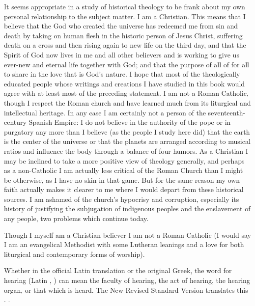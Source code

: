 It seems appropriate in a study of historical theology to be frank about my own
personal relationship to the subject matter.
I am a Christian.
This means that I believe that the God who created the universe has redeemed me
from sin and death by taking on human flesh in the historic person of Jesus
Christ, suffering death on a cross and then rising again to new life on the
third day, and that the Spirit of God now lives in me and all other believers
and is working to give us ever-new and eternal life together with God; and that
the purpose of all of for all to share in the love that is God's nature.
I hope that most of the theologically educated people whose writings and
creations I have studied in this book would agree with at least most of the
preceding statement.
I am not a Roman Catholic, though I respect the Roman church and have learned
much from its liturgical and intellectual heritage.
In any case I am certainly not a person of the seventeenth-century Spanish
Empire: I do not believe in the authority of the pope or in purgatory any more
than I believe (as the people I study here did) that the earth is the center of
the universe or that the planets are arranged according to musical ratios and
influence the body through a balance of four humors.
As a Christian I may be inclined to take a more positive view of theology
generally, and perhaps as a non-Catholic I am actually less critical of the
Roman Church than I might be otherwise, as I have no skin in that game.
But for the same reason my own faith actually makes it clearer to me where I
would depart from these historical sources.
I am ashamed of the church's hypocrisy and corruption, especially its history
of justifying the subjugation of indigenous peoples and the enslavement of any
people, two problems which continue today.

Though I myself am a Christian believer I am not a Roman Catholic (I would say
I am an evangelical Methodist with some Lutheran leanings and a love for both
liturgical and contemporary forms of worship).

\begin{Footnote}
    Whether in the official Latin translation or the original Greek, the word for
    hearing (Latin , \Greek {}) can mean the faculty of
    hearing, the act of hearing, the hearing organ, or that which is heard.
    The New Revised Standard Version translates this .
    \Autocites{Weber:Vulgate}{Aland:GNT4}[]{BDAG}.
\end{Footnote}


